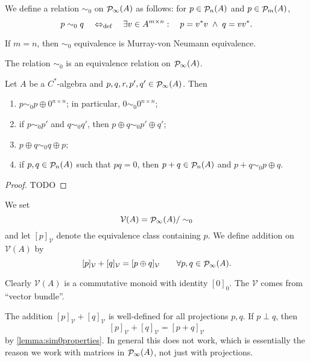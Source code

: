 \begin{definition}
We define a relation $\sim_0$ on $\mathop{\mathcal{P}}\nolimits_\infty(A)$ as follows: for $p\in \mathop{\mathcal{P}}\nolimits_n(A)$ and $p\in \mathop{\mathcal{P}}\nolimits_m(A)$,
\[ p \sim_0 q \quad\Leftrightarrow_{\text{def}}\quad \exists v\in A^{m\times n}: \quad p = v^*v\;\land \; q = vv^*. \]
\end{definition}
If $m=n$, then $\sim_0$ equivalence is Murray-von Neumann equivalence.
\begin{lemma}
The relation $\sim_0$ is an equivalence relation on $\mathop{\mathcal{P}}\nolimits_\infty(A)$.
\end{lemma}

\begin{lemma} \label{lemma:sim0properties}
Let $A$ be a $C^*$-algebra and $p,q,r,p',q'\in \mathop{\mathcal{P}}\nolimits_\infty(A)$. Then
\begin{enumerate}
\item $p\sim_0 p\oplus 0^{n\times n}$; in particular, $0 \sim_0 0^{n\times n}$;
\item if $p\sim_0 p'$ and $q\sim_0 q'$, then $p\oplus q \sim_0 p'\oplus q'$;
\item $p\oplus q \sim_0 q\oplus p$;
\item if $p,q\in\mathop{\mathcal{P}}\nolimits_n(A)$ such that $pq = 0$, then $p+q\in\mathop{\mathcal{P}}\nolimits_n(A)$ and $p+q \sim_0 p\oplus q$.
\end{enumerate}
\end{lemma}
\begin{proof}
TODO
\end{proof}

\begin{definition}
We set
\[ \mathcal{V}(A) = \mathop{\mathcal{P}}\nolimits_\infty(A) / \sim_0 \]
and let $[p]_\mathcal{V}$ denote the equivalence class containing $p$. We define addition on $\mathcal{V}(A)$ by
\[ [p]_\mathcal{V} + [q]_\mathcal{V} = [p\oplus q]_\mathcal{V} \qquad \forall p,q\in\mathop{\mathcal{P}}\nolimits_\infty(A). \]
\end{definition}
Clearly $\mathcal{V}(A)$ is a commutative monoid with identity $[0]_0$. The $\mathcal{V}$ comes from ``vector bundle''.

The addition $[p]_\mathcal{V} + [q]_\mathcal{V}$ is well-defined for all projections $p,q$. If $p\perp q$, then 
\[ [p]_\mathcal{V} + [q]_\mathcal{V} = [p+q]_\mathcal{V} \]
by \ref{lemma:sim0properties}. In general this does not work, which is essentially the reason we work with matrices in $\mathop{\mathcal{P}}\nolimits_\infty(A)$, not just with projections.

